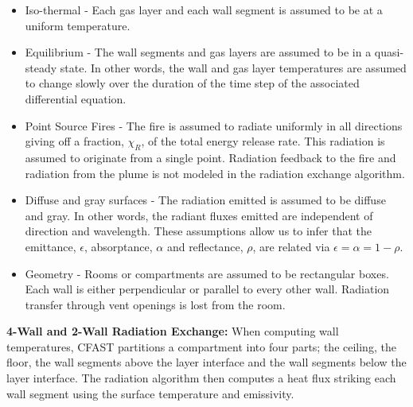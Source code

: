 \begin{itemize}
\item Iso-thermal - Each gas layer and each wall segment is assumed to be at a uniform temperature.

\item Equilibrium - The wall segments and gas layers are assumed to be in a quasi-steady state.  In other words, the wall and gas layer temperatures are assumed to change slowly over the duration of the time step of the associated differential equation.

\item Point Source Fires - The fire is assumed to radiate uniformly in all directions giving off a fraction, $\chi_R$, of the total energy release rate.  This radiation is assumed to originate from a single point.  Radiation feedback to the fire and radiation from the plume is not modeled in the radiation exchange algorithm.

\item Diffuse and gray surfaces - The radiation emitted is assumed to be diffuse and gray.  In other words, the radiant fluxes emitted are independent of direction and wavelength.  These assumptions allow us to infer that the emittance, $\epsilon$, absorptance, $\alpha$ and reflectance, $\rho$, are related via $\epsilon = \alpha = 1 - \rho$.

\item Geometry - Rooms or compartments are assumed to be rectangular boxes.  Each wall is either perpendicular or parallel to every other wall.  Radiation transfer through vent openings is lost from the room.
\end{itemize}

{\bf 4-Wall and 2-Wall Radiation Exchange:} When computing wall temperatures, CFAST partitions a compartment into four parts; the ceiling, the floor, the wall segments above the layer interface and the wall segments below the layer interface.  The radiation algorithm then computes a heat flux striking each wall segment using the surface temperature and emissivity.

